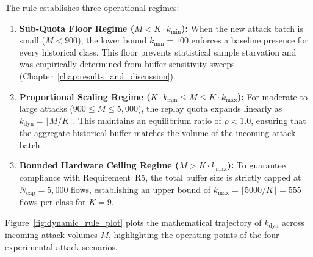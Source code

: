 The rule establishes three operational regimes:
\begin{enumerate}
    \item \textbf{Sub-Quota Floor Regime ($M < K \cdot k_{\min}$):} When the new attack batch is small ($M < 900$), the lower bound $k_{\min} = 100$ enforces a baseline presence for every historical class. This floor prevents statistical sample starvation and was empirically determined from buffer sensitivity sweeps (Chapter~\ref{chap:results_and_discussion}).
    \item \textbf{Proportional Scaling Regime ($K \cdot k_{\min} \le M \le K \cdot k_{\max}$):} For moderate to large attacks ($900 \le M \le 5{,}000$), the replay quota expands linearly as $k_{\text{dyn}} = \lfloor M/K \rfloor$. This maintains an equilibrium ratio of $\rho \approx 1.0$, ensuring that the aggregate historical buffer matches the volume of the incoming attack batch.
    \item \textbf{Bounded Hardware Ceiling Regime ($M > K \cdot k_{\max}$):} To guarantee compliance with Requirement~R5, the total buffer size is strictly capped at $N_{\text{cap}} = 5{,}000$ flows, establishing an upper bound of $k_{\max} = \lfloor 5000 / K \rfloor = 555$ flows per class for $K = 9$.
\end{enumerate}

Figure~\ref{fig:dynamic_rule_plot} plots the mathematical trajectory of $k_{\text{dyn}}$ across incoming attack volumes $M$, highlighting the operating points of the four experimental attack scenarios.

